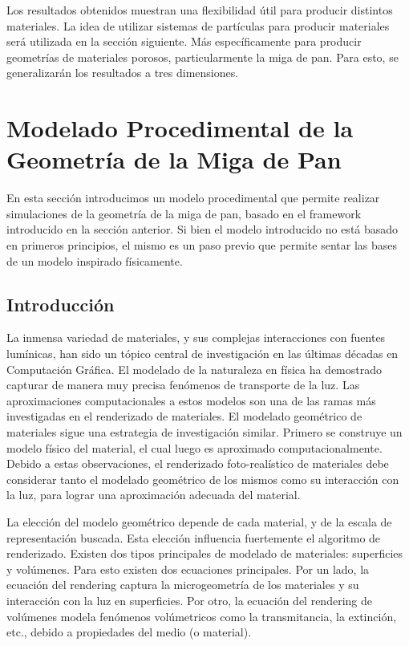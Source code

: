 \documentclass[spanish,a4paper,11pt,oneside,links]{report}
\begin{document}
Los resultados obtenidos muestran una flexibilidad útil para producir distintos materiales.
La idea de utilizar sistemas de partículas para producir materiales será utilizada en la sección siguiente.
Más específicamente para producir geometrías de materiales porosos, particularmente la miga de pan.
Para esto, se generalizarán los resultados a tres dimensiones.

\section{Modelado Procedimental de la Geometría de la Miga de Pan}
En esta sección introducimos un modelo procedimental que permite realizar simulaciones de la geometr\'ia de la miga de pan, basado en el framework introducido en la secci\'on anterior.
Si bien el modelo introducido no está basado en primeros principios, el mismo es un paso previo que permite sentar las bases de un modelo inspirado físicamente.

\subsection{Introducción}
La inmensa variedad de materiales, y sus complejas interacciones con fuentes lumínicas, han sido un tópico central de investigación en las últimas décadas en Computación Gráfica.
El modelado de la naturaleza en física ha demostrado capturar de manera muy precisa fenómenos de transporte de la luz.
Las aproximaciones computacionales a estos modelos son una de las ramas más investigadas en el renderizado de materiales.
El modelado geométrico de materiales sigue una estrategia de investigación similar. Primero se construye un modelo físico del material, el cual luego es aproximado computacionalmente.
Debido a estas observaciones, el renderizado foto-realístico de materiales debe considerar tanto el modelado geométrico de los mismos como su interacción con la luz, para lograr una aproximación adecuada del material.

La elección del modelo geométrico depende de cada material, y de la escala de representación buscada.
Esta elección influencia fuertemente el algoritmo de renderizado. 
Existen dos tipos principales de modelado de materiales: superficies y volúmenes.
Para esto existen dos ecuaciones principales.
Por un lado, la ecuación del rendering \cite{Kajiya1986} captura la microgeometría de los materiales y su interacción con la luz en superficies.
Por otro, la ecuación del rendering de volúmenes \cite{Kajiya1984} modela fenómenos volúmetricos como la transmitancia, la extinción, etc., debido a propiedades del medio (o material).
\end{document}
